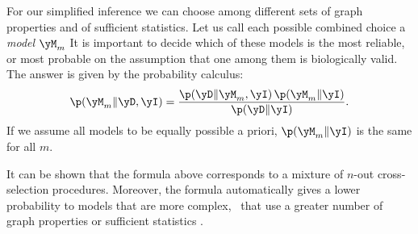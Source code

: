 For our simplified inference we can choose among different sets of graph
properties and of sufficient statistics. Let us call each possible combined
choice a \emph{model} $\yM_m$ It is important to decide which of these
models is the most reliable, or most probable on the assumption that one
among them is biologically valid. The answer is given by the probability
calculus:
\begin{equation}
  \label{eq:model_selection}
  \p(\yM_m \| \yD, \yI) =
  \frac{
\p(\yD \| \yM_m, \yI)\, \p(\yM_m \| \yI)
}{ \p(\yD \| \yI)}.
\end{equation}
If we assume all models to be equally possible a priori, $\p(\yM_m \| \yI)$
is the same for all $m$.

It can be shown that the formula above corresponds to a mixture of $n$-out
cross-selection procedures. Moreover, the formula automatically gives a
lower probability to models that are more complex, \ie\ that use a greater
number of graph properties or sufficient statistics \citep{mackay1992}.
